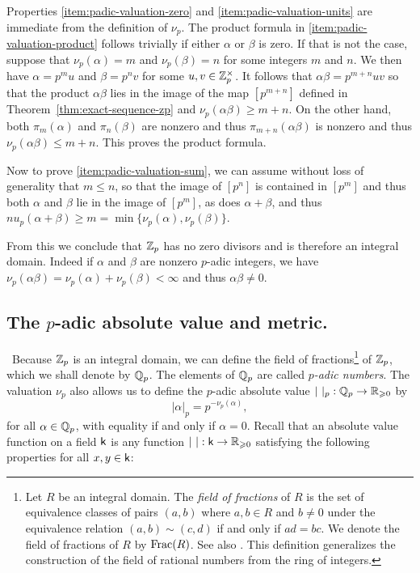 \smallskip

Properties \ref{item:padic-valuation-zero} and \ref{item:padic-valuation-units}
are immediate from the definition of \(\nu_p\). The product formula in
\ref{item:padic-valuation-product} follows trivially if either \(\alpha\) or
\(\beta\) is zero. If that is not the case, suppose that \(\nu_p(\alpha) = m\)
and \(\nu_p(\beta) = n\) for some integers \(m\) and \(n\). We then have
\(\alpha = p^mu\) and \(\beta = p^nv\) for some \(u, v \in \mathbb{Z}_p^{\times}\). It follows
that \(\alpha\beta = p^{m + n}uv\) so that the product \(\alpha\beta\) lies in
the image of the map \([p^{m+n}]\) defined in
Theorem~\ref{thm:exact-sequence-zp} and \(\nu_p(\alpha\beta) \geq m + n\). On
the other hand, both \(\pi_m(\alpha)\) and \(\pi_n(\beta)\) are nonzero and thus
\(\pi_{m+n}(\alpha\beta)\) is nonzero and thus \(\nu_p(\alpha\beta) \leq m +
n\). This proves the product formula.

Now to prove \ref{item:padic-valuation-sum}, we can assume without loss of
generality that \(m \leq n\), so that the image of \([p^n]\) is contained in
\([p^m]\) and thus both \(\alpha\) and \(\beta\) lie in the image of \([p^m]\),
as does \(\alpha + \beta\), and thus \(nu_p(\alpha + \beta) \geq m =
\min\{\nu_p(\alpha), \nu_p(\beta)\}\).

From this we conclude that \(\mathbb{Z}_p\) has no zero divisors and is therefore
an integral domain. Indeed if \(\alpha\) and \(\beta\) are nonzero \(p\)-adic
integers, we have \(\nu_p(\alpha\beta) = \nu_p(\alpha) + \nu_p(\beta) < \infty\)
and thus \(\alpha\beta \neq 0\).

\subsection{The \(p\)-adic absolute value and
    metric.}\label{sec:padic-absolute-value}~Because \(\mathbb{Z}_p\) is an
    integral domain, we can define the field of fractions\footnote{ Let \(R\) be
    an integral domain. The \emph{field of fractions} of \(R\) is the set of
    equivalence classes of pairs \((a, b)\) where \(a, b \in R\) and \(b \neq
    0\) under the equivalence relation \((a, b) \sim (c, d)\) if and only if
    \(ad = bc\). We denote the field of fractions of \(R\) by \(\operatorname{Frac}(R)\).
    See also \cite[p.~142]{hungerford2012algebra}. This definition generalizes
    the construction of the field of rational numbers from the ring of integers.
    } of \(\mathbb{Z}_p\), which we shall denote by \(\mathbb{Q}_p\). The
    elements of \(\mathbb{Q}_p\) are called \emph{\(p\)-adic numbers}. The
    valuation \(\nu_p\) also allows us to define the \(p\)-adic absolute value
    \(|\ |_p : \mathbb{Q}_p \to \mathbb{R}_{\geqslant 0}\) by
\[
  |\alpha|_p = p^{-\nu_p(\alpha)},
\]
for all \(\alpha \in \mathbb{Q}_p\), with equality if and only if \(\alpha =
0\). Recall that an absolute value function on a field \(\mathsf{k}\) is any
function \(|\ | : \mathsf{k} \to \mathbb{R}_{\geqslant 0}\) satisfying the following
properties for all \(x, y \in \mathsf{k}\):

